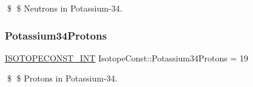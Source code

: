 \$ \$ Neutrons in Potassium-\/34. \mbox{\label{group___isotope_const-_potassium-_k34_ga5fb0e172819ee49443ca4f35bff5ed3c}} 
\subsubsection{\texorpdfstring{Potassium34\+Protons}{Potassium34Protons}}
{\footnotesize\ttfamily \mbox{\hyperlink{group___isotope_const-_macros_ga5f18360b3e99483a35c32d789e62621c}{I\+S\+O\+T\+O\+P\+E\+C\+O\+N\+S\+T\+\_\+\+I\+NT}} Isotope\+Const\+::\+Potassium34\+Protons = 19}

\$ \$ Protons in Potassium-\/34. 